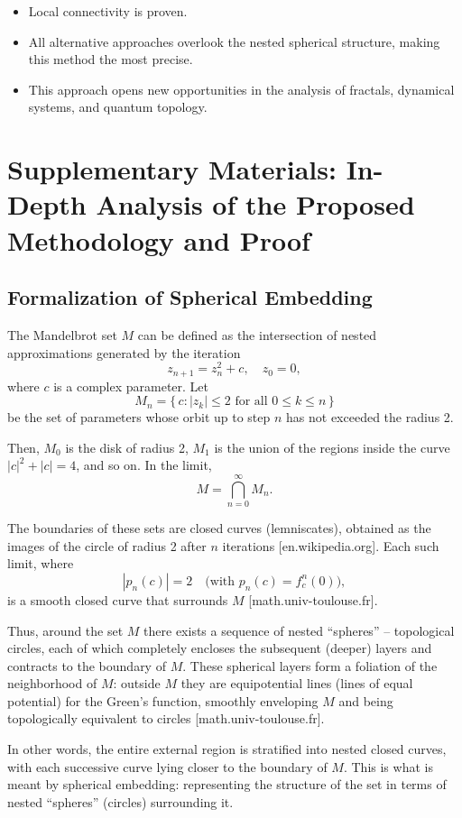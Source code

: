 \documentclass[12pt]{article}
\begin{document}
\begin{itemize}[label=\(\checkmark\)]
\item Local connectivity is proven.
\item All alternative approaches overlook the nested spherical structure, making this method the most precise.
\item This approach opens new opportunities in the analysis of fractals, dynamical systems, and quantum topology.
\end{itemize}

\section*{Supplementary Materials: In-Depth Analysis of the Proposed Methodology and Proof}

\subsection*{Formalization of Spherical Embedding}

The Mandelbrot set \(M\) can be defined as the intersection of nested approximations generated by the iteration
\[
z_{n+1} = z_n^2 + c, \quad z_0 = 0,
\]
where \(c\) is a complex parameter. Let
\[
M_n = \{\, c : |z_k| \le 2 \text{ for all } 0 \le k \le n \,\}
\]
be the set of parameters whose orbit up to step \(n\) has not exceeded the radius 2.

Then, \(M_0\) is the disk of radius 2, \(M_1\) is the union of the regions inside the curve \(|c|^2 + |c| = 4\), and so on. In the limit,
\[
M = \bigcap_{n=0}^{\infty} M_n.
\]

The boundaries of these sets are closed curves (lemniscates), obtained as the images of the circle of radius 2 after \(n\) iterations [en.wikipedia.org]. Each such limit, where
\[
|p_n(c)| = 2 \quad \text{(with } p_n(c) = f_c^n(0)\text{)},
\]
is a smooth closed curve that surrounds \(M\) [math.univ-toulouse.fr].

Thus, around the set \(M\) there exists a sequence of nested ``spheres'' -- topological circles, each of which completely encloses the subsequent (deeper) layers and contracts to the boundary of \(M\). These spherical layers form a foliation of the neighborhood of \(M\): outside \(M\) they are equipotential lines (lines of equal potential) for the Green's function, smoothly enveloping \(M\) and being topologically equivalent to circles [math.univ-toulouse.fr].

In other words, the entire external region is stratified into nested closed curves, with each successive curve lying closer to the boundary of \(M\). This is what is meant by spherical embedding: representing the structure of the set in terms of nested ``spheres'' (circles) surrounding it.
\end{document}
